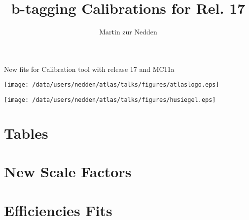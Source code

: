 \documentclass{beamer}
\begin{document}
\renewcommand{\inserttotalframenumber}{55}
\renewcommand{\emph}[1]{\structure{#1}}
\renewcommand\arraystretch{1.2}
\newcommand{\dred}{\textcolor[rgb]{0.5,0.0,0.0}}
\newcommand{\dgreen}{\textcolor{green!50!black}}
\addtocounter{framenumber}{-1}
\title[b-tagging Calibration]{b-tagging Calibrations for Rel. 17}
\author[M.zur Nedden]{Martin zur Nedden}
\date{}
\begin{frame}
  [plain]\titlepage
  \begin{center}
    \large
    New fits for Calibration tool with release 17 and MC11a
  \end{center}
  \begin{minipage}{12cm}
    \begin{minipage}[top]{2cm}
      \texttt{[image: /data/users/nedden/atlas/talks/figures/atlaslogo.eps]}
    \end{minipage}
    \hfill
    \begin{minipage}[top]{4.5cm}
      \texttt{[image: /data/users/nedden/atlas/talks/figures/husiegel.eps]}
    \end{minipage}
    
  \end{minipage}
  
\end{frame}

\section{Tables}


\section{New Scale Factors}


\section{Efficiencies Fits}

\end{document}
